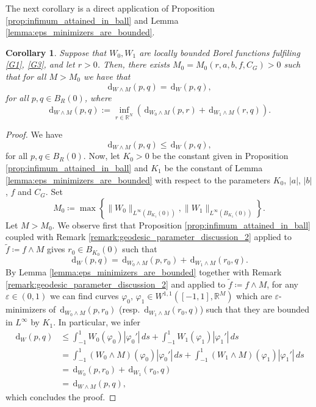 \documentclass[a4paper, 11pt, reqno]{amsart}
\theoremstyle{plain}
\newtheorem{corollary}[theorem]{Corollary}
\theoremstyle{definition}
\theoremstyle{remark}
\newcommand{\R}{\mathbb R}
\newcommand{\eps}{\varepsilon}
\newcommand{\dd}{\,\mathrm{d}}
\begin{document}
The next corollary is a direct application of Proposition \ref{prop:infimum_attained_in_ball} and Lemma \ref{lemma:eps_minimizers_are_bounded}.
\begin{corollary}\label{corol:truncation_constant}
    Suppose that $W_0, W_1$ are locally bounded Borel functions fulfiling \ref{G1}, \ref{G3}, and let $r > 0$. Then, there exists $M_0 = M_0(r, a, b, f, C_G) > 0$ such that for all $M > M_0$ we have that 
    \[
        \dd_{W \land M}(p, q) = \dd_{W}(p, q),
    \]
    for all $p, q \in B_R(0)$, where 
    \[
        \dd_{W \land M}(p, q) := \inf_{r \in \R^N} ( \dd_{W_0 \land M}(p, r) + \dd_{W_1 \land M}(r, q) ).
    \]
\end{corollary}
\begin{proof}
    We have
    \[
        \dd_{W \land M}(p, q) \leq \dd_{W}(p, q),
    \]
    for all $p,q \in B_R (0)$.
    Now, let $K_0 > 0$ be the constant given in Proposition \ref{prop:infimum_attained_in_ball} and $K_1$ be the constant of Lemma \ref{lemma:eps_minimizers_are_bounded} with respect to the parameters $K_0$, $|a|$, $|b|$, $f$ and $C_G$. Set 
    $$ M_0 \coloneqq \max \left\{\|W_0 \|_{L^\infty(B_{K_1}(0))}, \|W_1 \|_{L^\infty(B_{K_1}(0))} \right\}.$$ 
    Let $M > M_0$. We observe first that Proposition \ref{prop:infimum_attained_in_ball} coupled with Remark \ref{remark:geodesic_parameter_discussion_2} applied to $\tilde f \coloneqq f \land M$ gives $r_0 \in B_{K_0}(0)$ such that  
    \[
         \dd_W(p,q) = \dd_{W_0\land M}(p, r_0) + \dd_{W_1 \land M}(r_0, q).
    \]    
    By Lemma \ref{lemma:eps_minimizers_are_bounded} together with Remark \ref{remark:geodesic_parameter_discussion_2} and applied to $\tilde f \coloneqq f\land M$, for any $\eps \in (0,1)$ we can find curves $\varphi_0, \, \varphi_1 \in W^{1,1}([-1,1], \R^M)$ which are $\eps$-minimizers of $\dd_{W_0 \land M}(p, r_0)$ (resp. $\dd_{W_1 \land M}(r_0, q)$) such that they are bounded in $L^\infty$ by $K_1$.  In particular, we infer 
    \begin{align*}
        \dd_W(p,q) &\leq \int_{-1}^1 W_0(\varphi_0)|\varphi_0'| \, ds + \int_{-1}^1 W_1(\varphi_1)|\varphi_1'| \, ds  \\
        &=  \int_{-1}^1 (W_0\land M)(\varphi_0)|\varphi_0'| \, ds + \int_{-1}^1 (W_1\land M)(\varphi_1)|\varphi_1'| \, ds \\
        &= \dd_{W_0}(p, r_0) + \dd_{W_1}(r_0, q) \\
        &= \dd_{W \land M}(p, q),
    \end{align*}
    which concludes the proof.
\end{proof}
\end{document}
